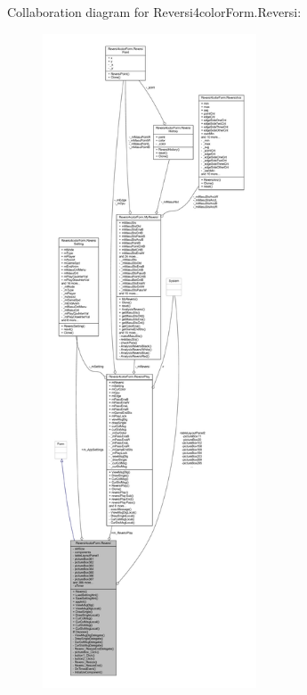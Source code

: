 Collaboration diagram for Reversi4color\+Form.\+Reversi\+:\nopagebreak
\begin{figure}[H]
\begin{center}
\leavevmode
\includegraphics[height=550pt]{class_reversi4color_form_1_1_reversi__coll__graph}
\end{center}
\end{figure}
